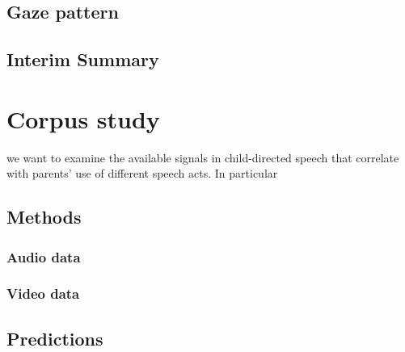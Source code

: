 

\subsection{Gaze pattern}
\label{sec:engsp:bg:gaze}


\subsection{Interim Summary}
\label{sec:engsp:bg:summary}

\section{Corpus study}
\label{sec:engsp:corpus}


we want to examine the available signals in child-directed speech that correlate with parents' use of different speech acts. In particular

\subsection{Methods}
\label{sec:engsp:corpus:method}

\label{sec:engsp:corpus:uttgoals}
\subsubsection{Audio data}
\label{sec:engsp:corpus:audio}
\subsubsection{Video data}
\label{sec:engsp:corpus:video}


\subsection{Predictions}
\label{sec:engsp:predictions}

